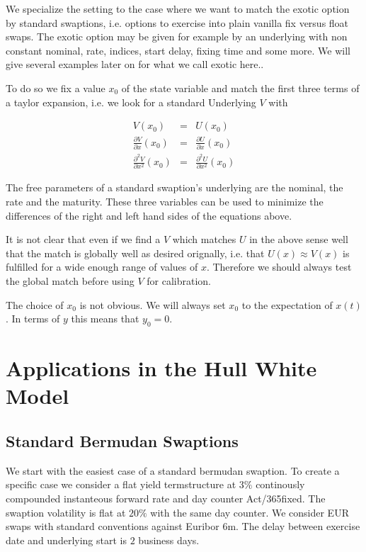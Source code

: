 \documentclass{amsart}
\theoremstyle{plain}
\numberwithin{equation}{section}
\begin{document}
We specialize the setting to the case where we want to match the exotic option by standard swaptions, i.e. options
to exercise into plain vanilla fix versus float swaps. The exotic option may be given for example by an underlying
with non constant nominal, rate, indices, start delay, fixing time and some more. We will give several examples later
on for what we call exotic here..

To do so we fix a value $x_0$ of the state variable and match the first three terms of a taylor expansion, i.e. we
look for a standard Underlying $V$ with

\begin{eqnarray}
V(x_0) &=& U(x_0) \\
\frac{\partial V }{\partial x}(x_0) &=& \frac{\partial U }{\partial x}(x_0) \\
\frac{\partial^2 V }{\partial x^2}(x_0) &=& \frac{\partial^2 U }{\partial x^2}(x_0)
\end{eqnarray}

The free parameters of a standard swaption's underlying are the nominal, the rate and the maturity. These three
variables can be used to minimize the differences of the right and left hand sides of the equations above.

It is not clear that even if we find a $V$ which matches $U$ in the above sense well that the match is globally
well as desired orignally, i.e. that $U(x) \approx V(x)$ is fulfilled for a wide enough range of values of $x$. Therefore
we should always test the global match before using $V$ for calibration.

The choice of $x_0$ is not obvious. We will always set $x_0$ to the expectation of $x(t)$. In terms of $y$ this
means that $y_0 = 0$.

\section{Applications in the Hull White Model}

\subsection{Standard Bermudan Swaptions}
\label{secStdBermudanSwaption}

We start with the easiest case of a standard bermudan swaption. To create a specific case we consider a flat
yield termstructure at $3\%$ continously compounded instanteous forward rate and day counter Act/365fixed. The
swaption volatility is flat at $20\%$ with the same day counter. We consider EUR swaps with standard conventions
against Euribor 6m. The delay between exercise date and underlying start is $2$ business days.
\end{document}
